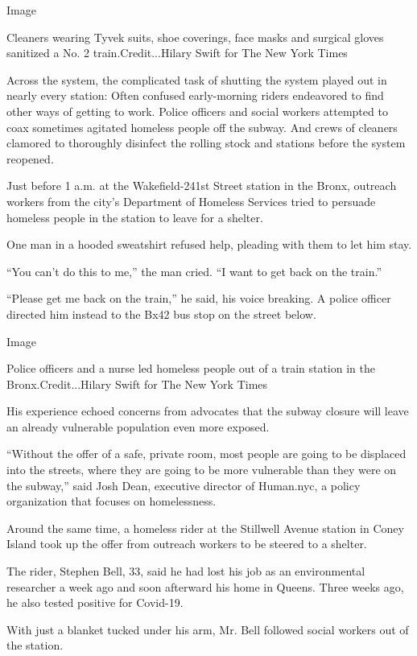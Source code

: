 Image

Cleaners wearing Tyvek suits, shoe coverings, face masks and surgical
gloves sanitized a No. 2 train.Credit...Hilary Swift for The New York
Times

Across the system, the complicated task of shutting the system played
out in nearly every station: Often confused early-morning riders
endeavored to find other ways of getting to work. Police officers and
social workers attempted to coax sometimes agitated homeless people off
the subway. And crews of cleaners clamored to thoroughly disinfect the
rolling stock and stations before the system reopened.

Just before 1 a.m. at the Wakefield-241st Street station in the Bronx,
outreach workers from the city's Department of Homeless Services tried
to persuade homeless people in the station to leave for a shelter.

One man in a hooded sweatshirt refused help, pleading with them to let
him stay.

``You can't do this to me,'' the man cried. ``I want to get back on the
train.''

``Please get me back on the train,'' he said, his voice breaking. A
police officer directed him instead to the Bx42 bus stop on the street
below.

Image

Police officers and a nurse led homeless people out of a train station
in the Bronx.Credit...Hilary Swift for The New York Times

His experience echoed concerns from advocates that the subway closure
will leave an already vulnerable population even more exposed.

``Without the offer of a safe, private room, most people are going to be
displaced into the streets, where they are going to be more vulnerable
than they were on the subway,'' said Josh Dean, executive director of
Human.nyc, a policy organization that focuses on homelessness.

Around the same time, a homeless rider at the Stillwell Avenue station
in Coney Island took up the offer from outreach workers to be steered to
a shelter.

The rider, Stephen Bell, 33, said he had lost his job as an
environmental researcher a week ago and soon afterward his home in
Queens. Three weeks ago, he also tested positive for Covid-19.

With just a blanket tucked under his arm, Mr. Bell followed social
workers out of the station.

